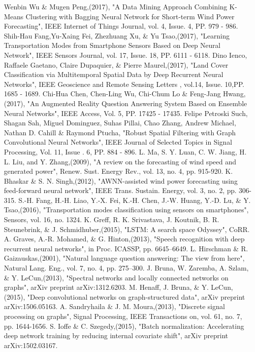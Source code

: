 \documentclass[10pt,a4paper,journal]{IEEEtran}
\begin{document}
 
\begin{thebibliography}{15}
 Wenbin Wu \& Mugen Peng,(2017), "A Data Mining Approach Combining K-Means Clustering with Bagging Neural Network for Short-term Wind Power Forecasting", IEEE Internet of Things Journal, vol. 4, Issue. 4, PP. 979 - 986.
  Shih-Hau Fang,Yu-Xaing Fei, Zhezhuang Xu, \& Yu Tsao,(2017), "Learning Transportation Modes from Smartphone
Sensors Based on Deep Neural Network", IEEE Sensors Journal, vol. 17, Issue. 18, PP. 6111 - 6118.
Dino Ienco, Raffaele Gaetano, Claire Dupaquier, \& Pierre Maurel,(2017), "Land Cover Classification via Multitemporal Spatial
Data by Deep Recurrent Neural Networks",  IEEE Geoscience and Remote Sensing Letters , vol.14, Issue. 10,PP. 1685 - 1689.
 Chi-Hua Chen, Chen-Ling Wu, Chi-Chum Lo \& Feng-Jang Hwang,(2017), "An Augmented Reality Question Answering
System Based on Ensemble Neural Networks", IEEE Access, Vol. 5, PP. 17425 - 17435.
 Felipe Petroski Such, Shagan Sah, Miguel Dominguez, Suhas Pillai, Chao Zhang, Andrew Michael, Nathan D. Cahill \& Raymond Ptucha, "Robust Spatial Filtering with Graph Convolutional Neural Networks",  IEEE Journal of Selected Topics in Signal Processing, Vol. 11, Issue . 6, PP. 884 - 896.
L. Ma, S. Y. Luan, C. W. Jiang, H. L. Liu, and Y. Zhang,(2009), "A review
on the forecasting of wind speed and generated power", Renew. Sust.
Energy Rev., vol. 13, no. 4, pp. 915-920.
K. Bhaskar \& S. N. Singh,(2012), "AWNN-assisted wind power forecasting
using feed-forward neural network", IEEE Trans. Sustain. Energy, vol.
3, no. 2, pp. 306-315.
S.-H. Fang, H.-H. Liao, Y.-X. Fei, K.-H. Chen, J.-W. Huang, Y.-D.
Lu, \& Y. Tsao,(2016), "Transportation modes classification using sensors on
smartphones", Sensors, vol. 16, no. 1324.
K. Greff, R. K. Srivastava, J. Koutnik, B. R. Steunebrink, \&
J. Schmidhuber,(2015), "LSTM: A search space Odyssey", CoRR.
A. Graves, A.-R. Mohamed, \& G. Hinton,(2013), "Speech recognition with
deep recurrent neural networks", in Proc. ICASSP, pp. 6645–6649.
L. Hirschman \& R. Gaizauskas,(2001), "Natural language question answering:
The view from here", Natural Lang. Eng., vol. 7, no. 4, pp. 275–300.
 J. Bruna, W. Zaremba, A. Szlam, \& Y. LeCun,(2013), "Spectral networks and
locally connected networks on graphs", arXiv preprint arXiv:1312.6203.
M. Henaff, J. Bruna, \& Y. LeCun,(2015), "Deep convolutional networks on
graph-structured data", arXiv preprint arXiv:1506.05163.
 A. Sandryhaila \& J. M. Moura,(2013), "Discrete signal processing on graphs",
Signal Processing, IEEE Transactions on, vol. 61, no. 7, pp. 1644-1656.
S. Ioffe \& C. Szegedy,(2015), "Batch normalization: Accelerating deep
network training by reducing internal covariate shift", arXiv preprint
arXiv:1502.03167.






\end{thebibliography} 
\end{document}
